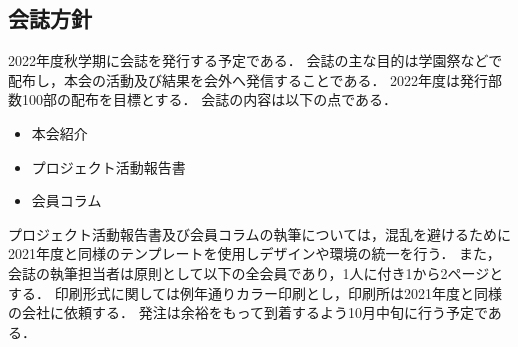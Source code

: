 \subsection*{会誌方針}








2022年度秋学期に会誌を発行する予定である．
会誌の主な目的は学園祭などで配布し，本会の活動及び結果を会外へ発信することである．
2022年度は発行部数100部の配布を目標とする．
会誌の内容は以下の点である．
\begin{itemize}
	\item 本会紹介
	\item プロジェクト活動報告書
	\item 会員コラム
\end{itemize}
プロジェクト活動報告書及び会員コラムの執筆については，混乱を避けるために2021年度と同様のテンプレートを使用しデザインや環境の統一を行う．
また，会誌の執筆担当者は原則として\thirdGrade{}以下の全会員であり，1人に付き1から2ページとする．
印刷形式に関しては例年通りカラー印刷とし，印刷所は2021年度と同様の会社に依頼する．
発注は余裕をもって到着するよう10月中旬に行う予定である．
